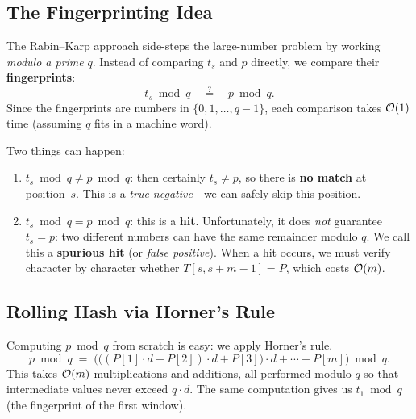 
\subsection{The Fingerprinting Idea}

The Rabin--Karp approach side-steps the large-number problem by working
\emph{modulo a prime} $q$.
Instead of comparing $t_s$ and $p$ directly, we compare their
\textbf{fingerprints}:
\[
  t_s \bmod q
  \quad\stackrel{?}{=}\quad
  p \bmod q.
\]
Since the fingerprints are numbers in $\{0, 1, \ldots, q-1\}$, each
comparison takes $\mathcal{O}\!\left(1\right)$ time (assuming $q$ fits in a machine word).

Two things can happen:

\begin{enumerate}[nosep]
  \item \textbf{$t_s \bmod q \neq p \bmod q$}: then certainly
        $t_s \neq p$, so there is \textbf{no match} at position~$s$.
        This is a \emph{true negative}---we can safely skip this
        position.

  \item \textbf{$t_s \bmod q = p \bmod q$}: this is a \textbf{hit}.
        Unfortunately, it does \emph{not} guarantee $t_s = p$:
        two different numbers can have the same remainder modulo $q$.
        We call this a \textbf{spurious hit} (or \emph{false positive}).
        When a hit occurs, we must verify character by character whether
        $T[s, s+m-1] = P$, which costs $\mathcal{O}\!\left(m\right)$.
\end{enumerate}


\subsection{Rolling Hash via Horner's Rule}

Computing $p \bmod q$ from scratch is easy: we apply Horner's rule.
\[
  p \bmod q \;=\;
  \bigl(\!\bigl((P[1]\cdot d + P[2])\cdot d + P[3]\bigr)
  \cdot d + \cdots + P[m]\bigr) \bmod q.
\]
This takes $\mathcal{O}\!\left(m\right)$ multiplications and additions, all performed modulo
$q$ so that intermediate values never exceed $q \cdot d$.
The same computation gives us $t_1 \bmod q$ (the fingerprint of the
first window).

